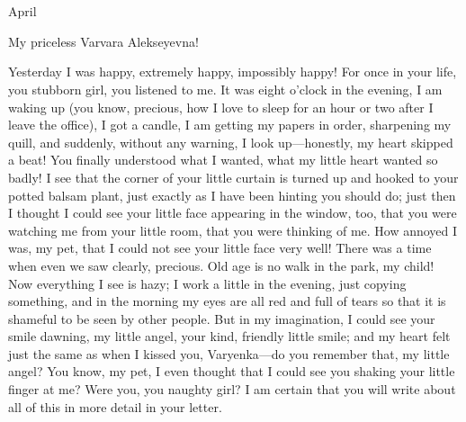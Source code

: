 \chapter*{}


\begin{flushright}
	April 
\end{flushright}

My priceless Varvara Alekseyevna!

Yesterday I was happy, extremely happy, impossibly happy! For once in your life, you stubborn girl, you listened to me. It was eight o'clock in the evening, I am waking up (you know, precious, how I love to sleep for an hour or two after I leave the office), I got a candle, I am getting my papers in order, sharpening my quill, and suddenly, without any warning, I look up---honestly, my heart skipped a beat! You finally understood what I wanted, what my little heart wanted so badly! I see that the corner of your little curtain is turned up and hooked to your potted balsam plant, just exactly as I have been hinting you should do; just then I thought I could see your little face appearing in the window, too, that you were watching me from your little room, that you were thinking of me. How annoyed I was, my pet, that I could not see your little face very well! There was a time when even we saw clearly, precious. Old age is no walk in the park, my child! Now everything I see is hazy; I work a little in the evening, just copying something, and in the morning my eyes are all red and full of tears so that it is shameful to be seen by other people. But in my imagination, I could see your smile dawning, my little angel, your kind, friendly little smile; and my heart felt just the same as when I kissed you, Varyenka---do you remember that, my little angel? You know, my pet, I even thought that I could see you shaking your little finger at me? Were you, you naughty girl? I am certain that you will write about all of this in more detail in your letter.

